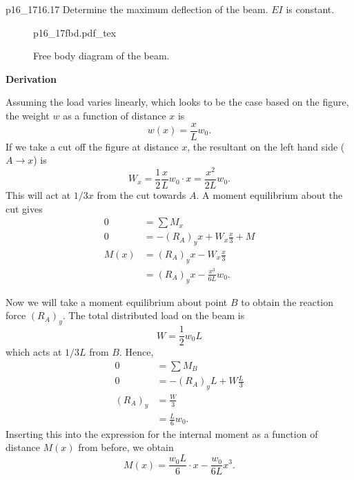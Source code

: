 \documentclass[a4paper]{article}
\newcommand{\incfig}[2][1]{%
  \def\svgwidth{#1\columnwidth}
  {#2.pdf_tex}
}
\newcounter{problem}
\numberwithin{equation}{problem}
\newcommand{\AUheading}[1]{%
  \par\vspace{.4\baselineskip}%
  {\sffamily\bfseries\color{AUblueDark}#1\par}%
  \nobreak%
}
\newenvironment{derivation}[1][Derivation]{%
  \AUheading{#1}
  \begingroup\allowdisplaybreaks
  \setlength{\abovedisplayskip}{6pt}%
  \setlength{\belowdisplayskip}{6pt}%
  \setlength{\abovedisplayshortskip}{4pt}%
  \setlength{\belowdisplayshortskip}{4pt}%
}{\par\endgroup\medskip}
\begin{document}


\begin{problemwithimage}{p16_17}{16.17}\label{pro:16-17}
  Determine the maximum deflection of the beam.
  $EI$ is constant.
\end{problemwithimage}

\begin{figure}[ht]
    \centering
    \incfig{p16_17fbd}
    \caption{Free body diagram of the beam.}
    \label{fig:p16_17fbd}
\end{figure}

\begin{derivation}
  Assuming the load varies linearly, which looks to be the case based on the figure, the weight $w$ as a function of distance $x$ is
  \begin{equation*}
    w(x) = \frac{x}{L} w_0
  .\end{equation*}
  If we take a cut off the figure at distance $x$, the resultant on the left hand side ($A \to x$) is
  \begin{equation*}
    W_x = \frac{1}{2} \frac{x}{L} w_0 \cdot x = \frac{x^2}{2 L} w_0
  .\end{equation*}
  This will act at $1 / 3 x$ from the cut towards $A$.
  A moment equilibrium about the cut gives
  \begin{align*}
    0 &= \sum M_x \\
    0 &= - \left( R_A \right)_y x + W_x \frac{x}{3} + M \\
    M(x) &= \left( R_A \right)_y x - W_x \frac{x}{3} \\
         &= \left( R_A \right)_y x - \frac{x^3}{6L} w_0
  .\end{align*}

  Now we will take a moment equilibrium about point $B$ to obtain the reaction force $\left( R_A \right)_y$.
  The total distributed load on the beam is
  \begin{equation*}
    W = \frac{1}{2} w_0 L
  \end{equation*}
  which acts at $1 / 3 L$ from $B$.
  Hence,
  \begin{align*}
    0 &= \sum M_B \\
    0 &= - \left( R_A \right)_y L + W \frac{L}{3} \\
    \left( R_A \right)_y &= \frac{W}{3} \\
      &= \frac{L}{6} w_0
  .\end{align*}
  Inserting this into the expression for the internal moment as a function of distance $M(x)$ from before, we obtain
  \begin{equation*}
    M(x) = \frac{w_0 L}{6} \cdot x - \frac{w_0}{6 L} x^3
  .\end{equation*}
  

\end{derivation}
\end{document}
